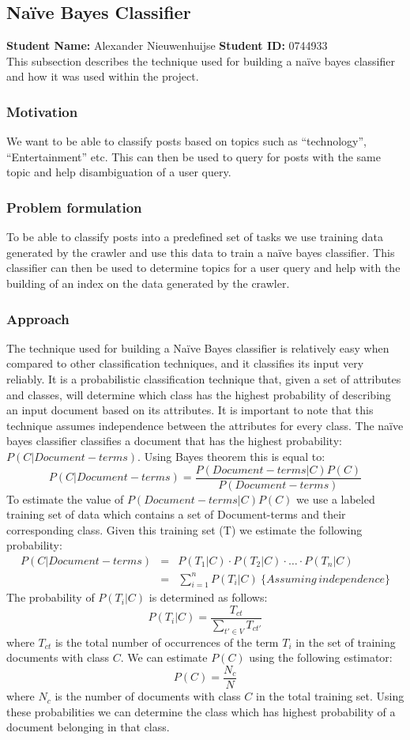 \subsection{Naïve Bayes Classifier}
\textbf{Student Name: }Alexander Nieuwenhuijse \textbf{Student ID:} 0744933\\
This subsection describes the technique used for building a naïve bayes classifier and how it was used within the project.
\subsubsection*{Motivation}
We want to be able to classify posts based on topics such as “technology”, “Entertainment” etc. This can then be used to query for posts with the same topic and help disambiguation of a user query.
\subsubsection*{Problem formulation}
To be able to classify posts into a predefined set of tasks we use training data generated by the crawler and use this data to train a naïve bayes classifier. This classifier can then be used to determine topics for a user query and help with the building of an index on the data generated by the crawler.
\subsubsection*{Approach}
The technique used for building a Naïve Bayes classifier is relatively easy when compared to other classification techniques, and it classifies its input very reliably. It is a probabilistic classification technique that, given a set of attributes and classes, will determine which class has the highest probability of describing an input document based on its attributes. It is important to note that this technique assumes independence between the attributes for every class.
The naïve bayes classifier classifies a document that has the highest probability:$ P(C|Document-terms)$. Using Bayes theorem this is equal to:
$$P(C|Document-terms)= \frac{P(Document-terms|C)P(C)}{P(Document-terms)}$$ 
To estimate the value of $P(Document-terms|C)P(C)$ we use a labeled training set of data which contains a set of Document-terms and their corresponding class. Given this training set (T) we estimate the following probability:
\begin{eqnarray*}
P(C|Document-terms) & = & P(T_{1}|C)\cdot P(T_{2}|C)\cdot\ldots\cdot P(T_{n}|C)\\
 & = & \sum_{i=1}^{n}P(T_{i}|C)\:\text{}\{Assuming\, independence\}
\end{eqnarray*}
The probability of $P(T_{i}|C)$ is determined as follows: 
$$P(T_{i}|C)=\frac{T_{ct}}{\sum_{t'\in V}T_{ct'}}$$ 
where $T_{ct}$ is the total number of occurrences of the term $T_{i}$ in the set of training documents with class $C$.
We can estimate $P(C)$ using the following estimator: $$P(C) = \frac{N_{c}}{N}$$ where $N_{c}$ is the number of documents with class $C$ in the total training set.
Using these probabilities we can determine the class which has highest probability of a document belonging in that class.